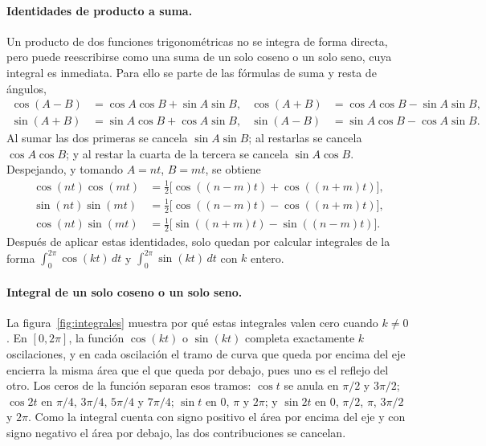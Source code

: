 \paragraph{Identidades de producto a suma.}
Un producto de dos funciones trigonométricas no se integra de forma directa, pero puede
reescribirse como una suma de un solo coseno o un solo seno, cuya integral es inmediata. Para
ello se parte de las fórmulas de suma y resta de ángulos,
\begin{align*}
\cos(A-B) &= \cos A\cos B + \sin A\sin B, & \cos(A+B) &= \cos A\cos B - \sin A\sin B,\\
\sin(A+B) &= \sin A\cos B + \cos A\sin B, & \sin(A-B) &= \sin A\cos B - \cos A\sin B.
\end{align*}
Al sumar las dos primeras se cancela $\sin A\sin B$; al restarlas se cancela
$\cos A\cos B$; y al restar la cuarta de la tercera se cancela $\sin A\cos B$. Despejando, y
tomando $A=nt$, $B=mt$, se obtiene
\begin{equation}\label{eq:producto-suma}
\begin{aligned}
\cos(nt)\cos(mt) &= \tfrac12\bigl[\cos((n-m)t) + \cos((n+m)t)\bigr],\\
\sin(nt)\sin(mt) &= \tfrac12\bigl[\cos((n-m)t) - \cos((n+m)t)\bigr],\\
\cos(nt)\sin(mt) &= \tfrac12\bigl[\sin((n+m)t) - \sin((n-m)t)\bigr].
\end{aligned}
\end{equation}
Después de aplicar estas identidades, solo quedan por calcular integrales de la forma
$\int_0^{2\pi}\cos(kt)\,dt$ y $\int_0^{2\pi}\sin(kt)\,dt$ con $k$ entero.

\paragraph{Integral de un solo coseno o un solo seno.}
La figura~\ref{fig:integrales} muestra por qué estas integrales valen cero cuando $k\ne 0$. En
$[0,2\pi]$, la función $\cos(kt)$ o $\sin(kt)$ completa exactamente $k$ oscilaciones, y en cada
oscilación el tramo de curva que queda por encima del eje encierra la misma área que el que
queda por debajo, pues uno es el reflejo del otro. Los ceros de la función separan esos tramos:
$\cos t$ se anula en $\pi/2$ y $3\pi/2$; $\cos 2t$ en $\pi/4$, $3\pi/4$, $5\pi/4$ y $7\pi/4$;
$\sin t$ en $0$, $\pi$ y $2\pi$; y $\sin 2t$ en $0$, $\pi/2$, $\pi$, $3\pi/2$ y $2\pi$. Como la
integral cuenta con signo positivo el área por encima del eje y con signo negativo el área
por debajo, las dos contribuciones se cancelan.

